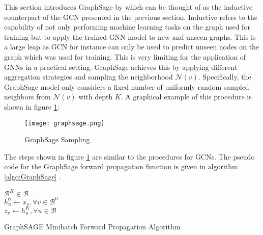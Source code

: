 	\noindent This section introduces GraphSage by \cite{hamilton2017inductive} 
	which can be thought of as the inductive counterpart of the GCN presented 
	in the previous section. Inductive refers to the capability of not only 
	performing machine learning tasks on the graph used for training but to 
	apply the trained GNN model to new and unseen graphs. This is a large leap 
	as GCN for instance can only be used to predict unseen nodes on the graph 
	which was used for training. This is very limiting for the application of 
	GNNs in a practical setting. GraphSage achieves this by applying different 
	aggregation strategies and sampling the neighborhood $\mathcal{N}(v)$.
	Specifically, the GraphSage model only considers a fixed number of 
	uniformly random sampled neighbors from $\mathcal{N}(v)$ with depth $K$. A 
	graphical example of this procedure is shown in figure \ref{fig:GraphSage_sample}:

	\begin{figure}[h]
		\centering
		\texttt{[image: graphsage.png]}
		\caption{GraphSage Sampling}
		\cite[p. 2]{hamilton2017inductive}
		\label{fig:GraphSage_sample}
	\end{figure}

	\noindent The steps shown in figure \ref{fig:GraphSage_sample} are similar
	to the procedures for GCNs. The pseudo code for the GraphSage forward 
	propagation function is given in algorithm \ref{algo:GraphSage} 
	\cite[p. 12]{hamilton2017inductive}. \\


	\begin{algorithm}[h]
		\scriptsize
		\SetAlgoLined
		\nl $\mathcal{B}^{K}\in\mathcal{B}$\\
		\nl {}
		\nl $h_{u}^{0}\leftarrow x_{v},\forall v \in \mathcal{B}^{0}$\\
		\nl {}
		\nl $z_v \leftarrow h_{u}^{K},\forall u \in \mathcal{B}$
		\caption{GraphSAGE Minibatch Forward Propagation Algorithm}
		\label{algo:GraphSage}
	\end{algorithm}
	
